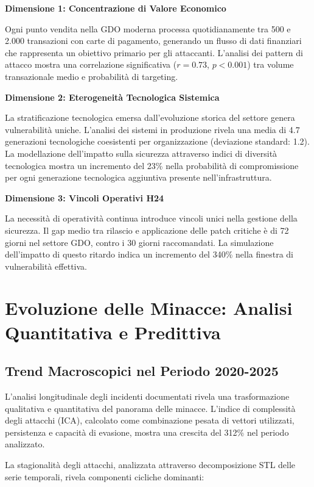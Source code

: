 \textbf{Dimensione 1: Concentrazione di Valore Economico}

Ogni punto vendita nella GDO moderna processa quotidianamente tra 500 e 2.000 transazioni con carte di pagamento, generando un flusso di dati finanziari che rappresenta un obiettivo primario per gli attaccanti. L'analisi dei pattern di attacco mostra una correlazione significativa ($r = 0.73$, $p < 0.001$) tra volume transazionale medio e probabilità di targeting. 

\textbf{Dimensione 2: Eterogeneità Tecnologica Sistemica}

La stratificazione tecnologica emersa dall'evoluzione storica del settore genera vulnerabilità uniche. L'analisi dei sistemi in produzione rivela una media di 4.7 generazioni tecnologiche coesistenti per organizzazione (deviazione standard: 1.2). La modellazione dell'impatto sulla sicurezza attraverso indici di diversità tecnologica mostra un incremento del 23\% nella probabilità di compromissione per ogni generazione tecnologica aggiuntiva presente nell'infrastruttura.

\textbf{Dimensione 3: Vincoli Operativi H24}

La necessità di operatività continua introduce vincoli unici nella gestione della sicurezza. Il gap medio tra rilascio e applicazione delle patch critiche è di 72 giorni nel settore GDO, contro i 30 giorni raccomandati. La simulazione dell'impatto di questo ritardo indica un incremento del 340\% nella finestra di vulnerabilità effettiva.

\section{Evoluzione delle Minacce: Analisi Quantitativa e Predittiva}

\subsection{Trend Macroscopici nel Periodo 2020-2025}

L'analisi longitudinale degli incidenti documentati rivela una trasformazione qualitativa e quantitativa del panorama delle minacce. L'indice di complessità degli attacchi (ICA), calcolato come combinazione pesata di vettori utilizzati, persistenza e capacità di evasione, mostra una crescita del 312\% nel periodo analizzato.

La stagionalità degli attacchi, analizzata attraverso decomposizione STL delle serie temporali, rivela componenti cicliche dominanti:

